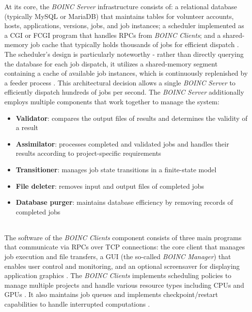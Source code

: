 At its core, the \emph{\ac{BOINC} Server} infrastructure consists of: a relational database (typically MySQL or MariaDB) that maintains tables for volunteer accounts, hosts, applications, versions, jobs, and job instances; a scheduler implemented as a \ac{CGI} or \ac{FCGI} program that handles \acs{RPC}s from \emph{\ac{BOINC} Clients}; and a shared-memory job cache that typically holds thousands of jobs for efficient dispatch \cite{relatedwork:boinc1}. The scheduler's design is particularly noteworthy - rather than directly querying the database for each job dispatch, it utilizes a shared-memory segment containing a cache of available job instances, which is continuously replenished by a feeder process \cite{relatedwork:boinc1}. This architectural decision allows a single \emph{\ac{BOINC} Server} to efficiently dispatch hundreds of jobs per second. The \emph{\ac{BOINC} Server} additionally employs multiple components that work together to manage the system:
\begin{itemize}
    \item \textbf{Validator}: compares the output files of results and determines the validity of a result
    \item \textbf{Assimilator}: processes completed and validated jobs and handles their results according to project-specific requirements
    \item \textbf{Transitioner}: manages job state transitions in a finite-state model
    \item \textbf{File deleter}: removes input and output files of completed jobs
    \item \textbf{Database purger}: maintains database efficiency by removing records of completed jobs
\end{itemize}
~\\
The software of the \emph{\ac{BOINC} Clients} component consists of three main programs that communicate via \acs{RPC}s over \acs{TCP} connections: the core client that manages job execution and file transfers, a \ac{GUI} (the so-called \emph{\ac{BOINC} Manager}) that enables user control and monitoring, and an optional screensaver for displaying application graphics \cite{relatedwork:boinc1}. The \emph{\ac{BOINC} Clients} implements scheduling policies to manage multiple projects and handle various resource types including \acs{CPU}s and \acs{GPU}s \cite{relatedwork:boinc1}. It also maintains job queues and implements checkpoint/restart capabilities to handle interrupted computations \cite{relatedwork:boinc1}. 

